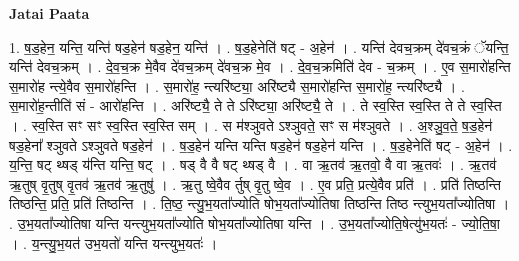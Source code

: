 \documentclass[17pt]{extarticle}
\begin{document}
\textbf{Jatai Paata} \newline

1. ष॒ड॒हेन॒ यन्ति॒ यन्ति॑ षड॒हेन॑ षड॒हेन॒ यन्ति॑ । . ष॒ड॒हेनेति॑ षट् - अ॒हेन॑ । . यन्ति॑ देवच॒क्रम् दे॑वच॒क्रं ॅयन्ति॒ यन्ति॑ देवच॒क्रम् । . दे॒व॒च॒क्र मे॒वैव दे॑वच॒क्रम् दे॑वच॒क्र मे॒व । . दे॒व॒च॒क्रमिति॑ देव - च॒क्रम् । . ए॒व स॒मारो॑हन्ति स॒मारो॑ह न्त्ये॒वैव स॒मारो॑हन्ति । . स॒मारो॑ह॒ न्त्यरि॑ष्ट्या॒ अरि॑ष्ट्यै स॒मारो॑हन्ति स॒मारो॑ह॒ न्त्यरि॑ष्ट्यै । . स॒मारो॑ह॒न्तीति॑ सं - आरो॑हन्ति । . अरि॑ष्ट्यै॒ ते ते ऽरि॑ष्ट्या॒ अरि॑ष्ट्यै॒ ते । . ते स्व॒स्ति स्व॒स्ति ते ते स्व॒स्ति । . स्व॒स्ति सꣳ सꣳ स्व॒स्ति स्व॒स्ति सम् । . स म॑श्ञुवते ऽश्ञुवते॒ सꣳ स म॑श्ञुवते । . अ॒श्ञु॒व॒ते॒ ष॒ड॒हेन॑ षड॒हेना᳚ श्ञुवते ऽश्ञुवते षड॒हेन॑ । . ष॒ड॒हेन॑ यन्ति यन्ति षड॒हेन॑ षड॒हेन॑ यन्ति । . ष॒ड॒हेनेति॑ षट् - अ॒हेन॑ । . य॒न्ति॒ षट् थ्षड् य॑न्ति यन्ति॒ षट् । . षड् वै वै षट् थ्षड् वै । . वा ऋ॒तव॑ ऋ॒तवो॒ वै वा ऋ॒तवः॑ । . ऋ॒तव॑ ऋ॒तुष् वृ॒तुष् वृ॒तव॑ ऋ॒तव॑ ऋ॒तुषु॑ । . ऋ॒तु ष्वे॒वैव र्तुष् वृ॒तु ष्वे॒व । . ए॒व प्रति॒ प्रत्ये॒वैव प्रति॑ । . प्रति॑ तिष्ठन्ति तिष्ठन्ति॒ प्रति॒ प्रति॑ तिष्ठन्ति । . ति॒ष्ठ॒ न्त्यु॒भ॒यता᳚ज्योति षोभ॒यता᳚ज्योतिषा तिष्ठन्ति तिष्ठ न्त्युभ॒यता᳚ज्योतिषा । . उ॒भ॒यता᳚ज्योतिषा यन्ति यन्त्युभ॒यता᳚ज्योति षोभ॒यता᳚ज्योतिषा यन्ति । . उ॒भ॒यता᳚ज्योति॒षेत्यु॑भ॒यतः॑ - ज्यो॒ति॒षा॒ । . य॒न्त्यु॒भ॒यत॑ उभ॒यतो॑ यन्ति यन्त्युभ॒यतः॑ । \newline
\end{document}
